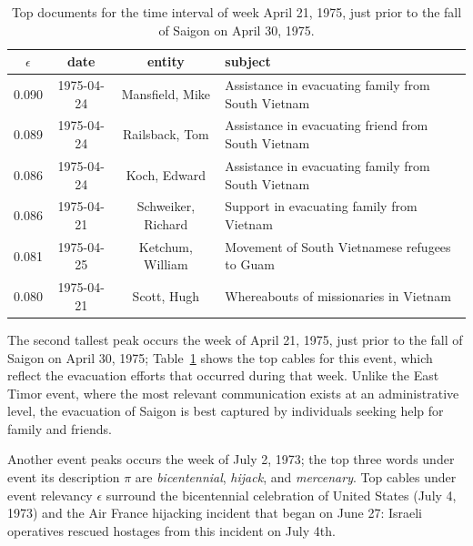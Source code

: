 \begin{table}[htb]
\small
\centering
\begin{tabular}{cccl}
\toprule
$\epsilon$ & date & entity & subject \\
\midrule
0.090   &  1975-04-24  &  Mansfield, Mike & Assistance in evacuating family from South Vietnam \\
0.089   &  1975-04-24  &  Railsback, Tom & Assistance in evacuating friend from South Vietnam \\
0.086   &  1975-04-24  &  Koch, Edward & Assistance in evacuating family from South Vietnam \\
0.086   &  1975-04-21  &  Schweiker, Richard & Support in evacuating family from Vietnam \\
0.081   &  1975-04-25  &  Ketchum, William & Movement of South Vietnamese refugees to Guam \\
0.080   &  1975-04-21  &  Scott, Hugh & Whereabouts of missionaries in Vietnam \\
\bottomrule
\end{tabular}
\label{tab:saigon}
\caption{Top documents for the time interval of week April 21, 1975, just prior to the fall of Saigon on April 30, 1975.}
\end{table}

The second tallest peak occurs the week of April 21, 1975, just prior to the fall of Saigon on April 30, 1975; Table~\ref{tab:saigon} shows the top cables for this event, which reflect the evacuation efforts that occurred during that week.  Unlike the East Timor event, where the most relevant communication exists at an administrative level, the evacuation of Saigon is best captured by individuals seeking help for family and friends.

Another event peaks occurs the week of July 2, 1973; the top three words under event its description $\pi$ are \emph{bicentennial}, \emph{hijack}, and \emph{mercenary}.  Top cables under event relevancy $\epsilon$ surround the bicentennial celebration of United States (July 4, 1973) and the Air France hijacking incident that began on June 27: Israeli operatives rescued hostages from this incident on July 4th.

